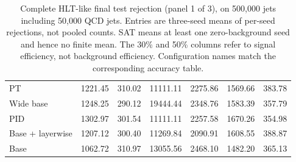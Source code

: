 \begin{table}[htbp]
\begin{tabularx}{\linewidth}{@{}Xrrrrrr@{}}
PT & 1221.45 & 310.02 & 11111.11 & 2275.86 & 1569.66 & 383.78 \\ %
Wide base & 1248.25 & 290.12 & 19444.44 & 2348.76 & 1583.39 & 357.79 \\ %
PID & 1302.97 & 301.54 & 11111.11 & 2257.58 & 1670.26 & 354.98 \\ %
Base + layerwise & 1207.12 & 300.40 & 11269.84 & 2090.91 & 1608.55 & 388.87 \\ %
Base & 1062.72 & 310.97 & 13055.56 & 2468.10 & 1482.20 & 365.13 \\ %
\bottomrule
\end{tabularx}
\caption{Complete HLT-like final test rejection (panel 1 of 3),
on 500,000 jets including 50,000 QCD jets. Entries are three-seed means of per-seed rejections, not pooled counts.
SAT means at least one zero-background seed and hence no finite mean.
The 30\% and 50\% columns refer to signal efficiency, not background
efficiency. Configuration names match the corresponding accuracy table.}
\label{tab:hlt-hlt-rejection-1}
\end{table}
